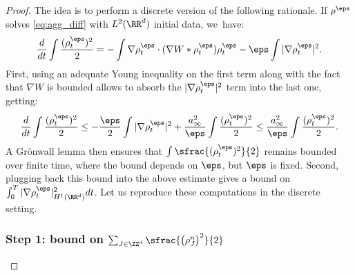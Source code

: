 \begin{proof}
The idea is to perform a discrete version of the following rationale. If $\rho^\eps$ solves \eqref{eq:agg_diff} with $L^2(\RR^d)$ initial data, we~have:
\[%
\frac{d}{dt} \int \frac{(\rho_t^\eps)^2}{2} = - \int \nabla \rho_t^\eps \cdot (\nabla W * \rho_t^\eps) \rho_t^\eps - \eps \int |\nabla \rho_t^\eps|^2.
\]
First, using an adequate Young inequality on the first term along with the fact that $\nabla W$ is bounded allows to absorb the $|\nabla \rho_t^\eps|^2$ term into the last one, getting:
\[
\frac{d}{dt} \int \frac{(\rho_t^\eps)^2}{2} \leq
- \frac{\eps}{2} \int |\nabla \rho_t^\eps|^2 + \frac{a_\infty^2}{\eps} \int \frac{(\rho_t^\eps)^2}{2} \leq \frac{a_\infty^2}{\eps} \int \frac{(\rho_t^\eps)^2}{2}.
\]
A Grönwall lemma then ensures that $\int \sfrac{(\rho_t^\eps)^2}{2}$ remains bounded over finite time, where the bound depends on $\eps$, but $\eps$ is fixed. Second, plugging back this bound into the above estimate gives a bound on $\int_0^T |\nabla \rho_t^\eps|_{H^1(\RR^d)}^2 dt$. Let us reproduce these computations in the discrete setting.

\subsubsection*{Step 1: bound on $\sum_{J \in \ZZ^d} \sfrac{\big(\rho_J^n\big)^2}{2}$}


\end{proof}

